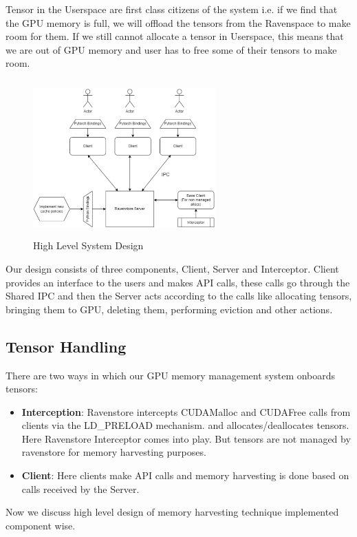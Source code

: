 \documentclass{article}
\begin{document}
Tensor in the Userspace are first class citizens of the system i.e. if we find that the GPU memory is full,
we will offload the tensors from the Ravenspace to make room for them. If we still cannot allocate a tensor in Userspace,
this means that we are out of GPU memory and user has to free some of their tensors to make room.

\begin{figure}[!htbp]
	\centering
	\includegraphics[height=6cm, width=7cm]{figures/hld.png}
	\caption{High Level System Design}
\end{figure}

Our design consists of three components, Client, Server and Interceptor. Client provides an interface to the users and makes API calls, 
these calls go through the Shared IPC and then the Server acts according to the calls like allocating tensors,
bringing them to GPU, deleting them, performing eviction and other actions. 

\subsection{Tensor Handling}
There are two ways in which our GPU memory management system onboards tensors:
\begin{itemize}
	\item \textbf{Interception}: Ravenstore intercepts CUDAMalloc and CUDAFree calls from clients via the LD\_PRELOAD mechanism.
	and allocates/deallocates tensors. Here Ravenstore Interceptor comes into play. But tensors are not managed by ravenstore for memory harvesting purposes.
	\item \textbf{Client}: Here clients make API calls and memory harvesting is done based on calls received by the Server.
\end{itemize}

Now we discuss high level design of memory harvesting technique implemented component wise.
\end{document}
